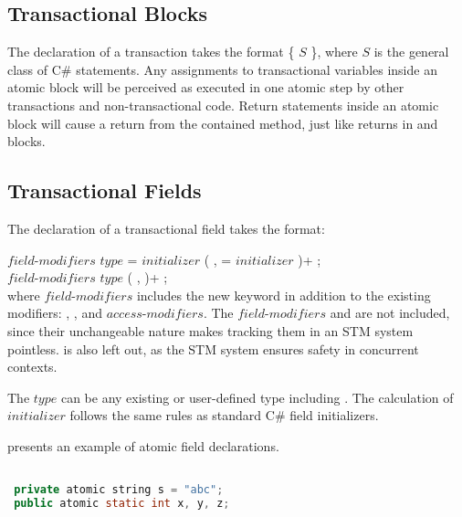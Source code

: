 \subsection{Transactional Blocks}
\label{subsec:design_atomic_block}
The declaration of a transaction takes the format  \{ $S$ \}, where $S$ is the general class of C\# statements. Any assignments to transactional variables inside an atomic block will be perceived as executed in one atomic step by other transactions and non-transactional code. Return statements inside an atomic block will cause a return from the contained method, just like returns in  and  blocks.
\subsection{Transactional Fields}\label{subsec:design_trans_field}
The declaration of a transactional field takes the format:

$field$-$modifiers$ $type$  = $initializer$ ( ,  = $initializer$ )+ ; \\
$field$-$modifiers$ $type$  ( ,  )+ ; \\

where $field$-$modifiers$ includes the new  keyword in addition to the existing modifiers: , , and $access$-$modifiers$\cite[p. 36]{sestoft2011c}. The $field$-$modifiers$  and  are not included, since their unchangeable nature makes tracking them in an \ac{STM} system pointless.  is also left out, as the \ac{STM} system ensures safety in concurrent contexts.

The $type$ can be any existing or user-defined type including . The calculation of $initializer$ follows the same rules as standard C\# field initializers\cite[p. 40]{sestoft2011c}.

 presents an example of atomic field declarations.

\begin{lstlisting}[label=lst:design_transactional_fields,
 caption={Local Transactional Variable},
 language=Java, 
 showspaces=false,
 showtabs=false,
 breaklines=true,
 showstringspaces=false,
 breakatwhitespace=true,
 commentstyle=\color{greencomments},
 keywordstyle=\color{bluekeywords},
 stringstyle=\color{redstrings},
 morekeywords={atomic, retry, orElse, var, get, set, string}]  % Start your code-block

 private atomic string s = "abc";
 public atomic static int x, y, z;
\end{lstlisting}

